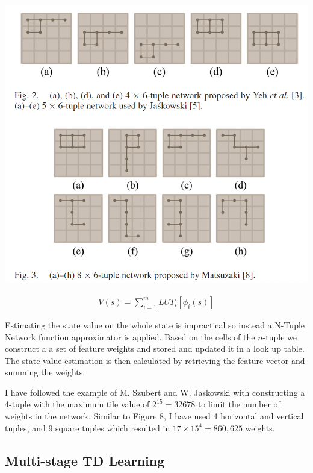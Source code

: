 \documentclass[letterpaper]{article} %
\begin{document}
\begin{center}
    \includegraphics[scale=.5]{images/ntuple-network2.png}
\end{center}

\begin{align}
    V(s) = \sum_{i=1}^{m} LUT_i[\phi_i(s)]
\end{align}

Estimating the state value on the whole state is impractical so instead a N-Tuple Network function approximator is applied. Based on the cells of the $n$-tuple we construct a a set of feature weights and stored and updated it in a look up table. The state value estimation is then calculated by retrieving the feature vector and summing the weights.

I have followed the example of M. Szubert and W. Jaskowski with constructing a 4-tuple with the maximum tile value of $2^{15}=32678$ to limit the number of weights in the network. Similar to Figure 8, I have used 4 horizontal and vertical tuples, and 9 square tuples which resulted in $17 \times 15^4 = 860,625$ weights.


\subsection{Multi-stage TD Learning}
\end{document}
